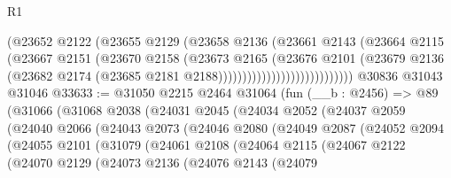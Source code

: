 \begin{lexlean}{R1}
\begin{coremodule}
                                    (@23652
                                      @2122
                                      (@23655
                                        @2129
                                        (@23658
                                          @2136
                                          (@23661
                                            @2143
                                            (@23664
                                              @2115
                                              (@23667
                                                @2151
                                                (@23670
                                                  @2158
                                                  (@23673
                                                    @2165
                                                    (@23676
                                                      @2101
                                                      (@23679
                                                        @2136
                                                        (@23682
                                                          @2174
                                                          (@23685
                                                            @2181
                                                            @2188))))))))))))))))))))))))))))
    @30836
    @31043
    @31046
@33633 := @31050
    @2215
    @2464
    @31064
    (fun (__b : @2456) =>
    @89
      (@31066
        (@31068
          @2038
          (@24031
            @2045
            (@24034
              @2052
              (@24037
                @2059
                (@24040
                  @2066
                  (@24043
                    @2073
                    (@24046
                      @2080
                      (@24049
                        @2087
                        (@24052
                          @2094
                          (@24055
                            @2101
                            (@31079
                              (@24061
                                @2108
                                (@24064
                                  @2115
                                  (@24067
                                    @2122
                                    (@24070
                                      @2129
                                      (@24073
                                        @2136
                                        (@24076
                                          @2143
                                          (@24079

\end{coremodule}
\end{lexlean}
